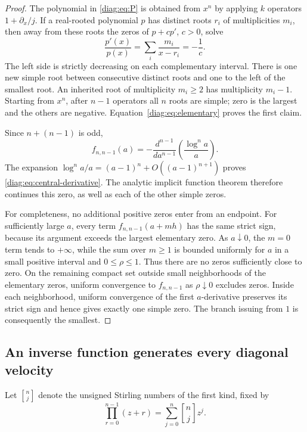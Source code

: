 \documentclass[11pt,a4paper]{article}
\theoremstyle{definition}
\theoremstyle{remark}
\newcommand{\stirling}[2]{\genfrac{[}{]}{0pt}{}{#1}{#2}}
\numberwithin{equation}{section}
\begin{document}
\begin{proof}
The polynomial in \eqref{diag:eq:P} is obtained from $x^n$ by applying
$k$ operators $1+\partial_x/j$.  If a real-rooted polynomial $p$ has
distinct roots $r_i$ of multiplicities $m_i$, then away from these roots
the zeros of $p+cp'$, $c>0$, solve
\[
 \frac{p'(x)}{p(x)}=\sum_i\frac{m_i}{x-r_i}=-\frac1c.
\]
The left side is strictly decreasing on each complementary interval.
There is one new simple root between consecutive distinct roots and one
to the left of the smallest root.  An inherited root of multiplicity
$m_i\geq2$ has multiplicity $m_i-1$.  Starting from $x^n$, after $n-1$
operators all $n$ roots are simple; zero is the largest and the others
are negative.  Equation~\eqref{diag:eq:elementary} proves the first claim.

Since $n+(n-1)$ is odd,
\[
 f_{n,n-1}(a)=-\frac{d^{n-1}}{da^{n-1}}
                       \left(\frac{\log^n a}{a}\right).
\]
The expansion $\log^n a/a=(a-1)^n+O((a-1)^{n+1})$ proves
\eqref{diag:eq:central-derivative}.  The analytic implicit function theorem
therefore continues this zero, as well as each of the other simple zeros.

For completeness, no additional positive zeros enter from an endpoint.
For sufficiently large $a$, every term $f_{n,n-1}(a+mh)$ has the same
strict sign, because its argument exceeds the largest elementary zero.
As $a\downarrow0$, the $m=0$ term tends to $+\infty$, while the sum over
$m\geq1$ is bounded uniformly for $a$ in a small positive interval and
$0\leq\rho\leq1$.  Thus there are no zeros sufficiently close to zero.
On the remaining compact set outside small neighborhoods of the elementary
zeros, uniform convergence to $f_{n,n-1}$ as $\rho\downarrow0$ excludes
zeros.  Inside each neighborhood, uniform convergence of the first
$a$-derivative preserves its strict sign and hence gives exactly one
simple zero.  The branch issuing from $1$ is consequently the smallest.
\end{proof}

\subsection{An inverse function generates every diagonal velocity}
\label{diag:subsec:inverse}

Let $\stirling{n}{j}$ denote the unsigned Stirling numbers of the
first kind, fixed by
\[
 \prod_{r=0}^{n-1}(z+r)=\sum_{j=0}^n\stirling{n}{j}z^j.
\]
\end{document}
